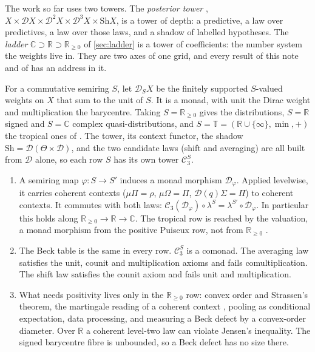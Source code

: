 \documentclass[11pt]{article}
\theoremstyle{definition}\newtheorem{definition}[theorem]{Definition}\newtheorem{remark}[theorem]{Remark}\newtheorem{example}[theorem]{Example}
\newcommand{\R}{\mathbb R}
\providecommand{\D}{\mathcal D}
\providecommand{\T}{\mathbb T}
\providecommand{\Sh}{\mathrm{Sh}}
\providecommand{\C}{\mathcal C}
\begin{document}
The work so far uses two towers. The \emph{posterior tower} \cite{Tower,TowerGeometry},
$X\times\D X\times\D^2X\times\D^3X\times\Sh X$, is a tower of depth: a predictive, a law over predictives, a law over those laws, and a
shadow of labelled hypotheses. The \emph{ladder} $\mathbb C\supset\R\supset\R_{\ge0}$ of \cref{sec:ladder} is a tower of coefficients:
the number system the weights live in. They are two axes of one grid, and every result of this note and of \cite{TowerGeometry} has an
address in it.

For a commutative semiring $S$, let $\D_SX$ be the finitely supported $S$-valued weights on $X$ that sum to the unit of $S$. It is a monad,
with unit the Dirac weight and multiplication the barycentre. Taking $S=\R_{\ge0}$ gives the distributions, $S=\R$ signed and
$S=\mathbb C$ complex quasi-distributions, and $S=\T=(\R\cup\{\infty\},\min,+)$ the tropical ones of \cite[\S11]{TowerGeometry}. The
tower, its context functor, the shadow $\Sh=\D(\Theta\times\D)$, and the two candidate laws (shift and averaging) are all built from $\D$
alone, so each row $S$ has its own tower $\C_3^S$.

\begin{proposition}\label{prop:grid}
\begin{enumerate}
\item[(a)] A semiring map $\varphi\colon S\to S'$ induces a monad morphism $\D_\varphi$. Applied levelwise, it carries coherent contexts
  ($\mu\Pi=\rho$, $\mu\Omega=\Pi$, $\D(q)\Sigma=\Pi$) to coherent contexts. It commutes with both laws:
  $\C_3(\D_\varphi)\circ\lambda^S=\lambda^{S'}\circ\D_\varphi$. In particular this holds along $\R_{\ge0}\to\R\to\mathbb C$. The tropical row is
  reached by the valuation, a monad morphism from the positive Puiseux row, not from $\R_{\ge0}$ \cite[Thm.~11.3]{TowerGeometry}.
\item[(b)] The Beck table is the same in every row. $\C_3^S$ is a comonad. The averaging law satisfies the unit, counit and
  multiplication axioms and fails comultiplication. The shift law satisfies the counit axiom and fails unit and multiplication.
\item[(c)] What needs positivity lives only in the $\R_{\ge0}$ row: convex order and Strassen's theorem, the martingale reading of a
  coherent context \cite[Thm.~5.3]{TowerGeometry}, pooling as conditional expectation, data processing, and measuring a Beck defect by a
  convex-order diameter. Over $\R$ a coherent level-two law can violate Jensen's inequality. The signed barycentre fibre is unbounded, so a
  Beck defect has no size there.
\end{enumerate}
\end{proposition}
\end{document}
